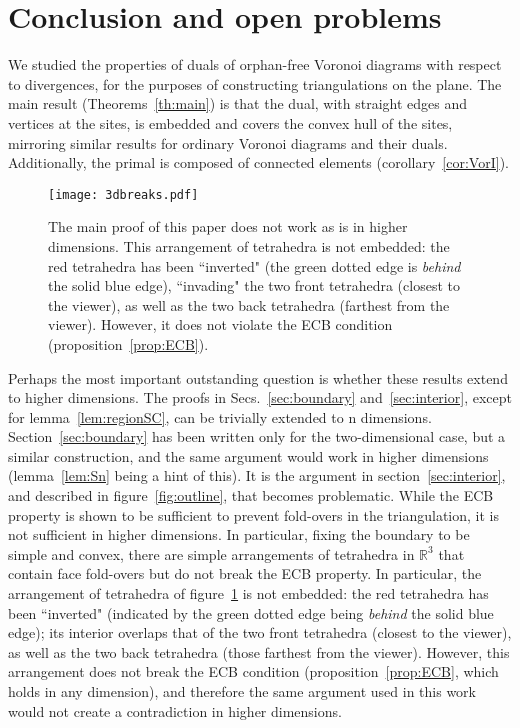 \documentclass[11pt]{article}
\begin{document}
\section{Conclusion and open problems}

We studied the properties of duals of orphan-free Voronoi diagrams with respect to divergences, for the
purposes of constructing triangulations on the plane. 
The main result (Theorems~\ref{th:main}) is that
the dual, with straight edges and vertices at the sites, is embedded
and covers the convex hull of the sites, mirroring similar results for
ordinary Voronoi diagrams and their duals.
Additionally, the primal is composed of connected elements (corollary~\ref{cor:VorI}). 




\begin{figure}[ht]
\centering
\texttt{[image: 3dbreaks.pdf]}
\caption{
	The main proof of this paper does not work as is in higher dimensions. 
This arrangement of tetrahedra is not embedded: 
	the red tetrahedra has been ``inverted" 
	(the green dotted edge is \emph{behind} the solid blue edge), 
	``invading" the two front tetrahedra (closest to the viewer), 
	as well as the two back tetrahedra (farthest from the viewer). 
However, it does not violate the ECB condition (proposition~\ref{prop:ECB}). 
}
\label{fig:3dbreaks}
\end{figure}
Perhaps the most important outstanding question is whether these results
extend to higher dimensions. The proofs in Secs.~\ref{sec:boundary} and~\ref{sec:interior},
except for lemma~\ref{lem:regionSC}, can be trivially extended to n dimensions. 
Section~\ref{sec:boundary} has been written only for the two-dimensional case,
but a similar construction, and the same argument would work in higher
dimensions (lemma~\ref{lem:Sn} being a hint of this). 
It is the argument in section~\ref{sec:interior}, and described in figure~\ref{fig:outline}, that becomes problematic. 
While the ECB property is shown to be sufficient to prevent fold-overs in the
triangulation, it is not sufficient in 
higher dimensions. In particular, fixing the boundary to be simple and convex, 
there are simple arrangements of tetrahedra in $\mathbb{R}^3$ that contain 
face fold-overs but do not break the ECB property. 
In particular, the arrangement of tetrahedra of figure~\ref{fig:3dbreaks} is not embedded: 
	the red tetrahedra has been ``inverted" 
	(indicated by the green dotted edge being \emph{behind} the solid blue edge); 
	its interior overlaps that of the two front tetrahedra (closest to the viewer), 
	as well as the two back tetrahedra (those farthest from the viewer). 
However, this arrangement does not break the ECB condition (proposition~\ref{prop:ECB}, which holds in any dimension), 
	and therefore the same argument used in this work would not create a 
	contradiction in higher dimensions. 
\end{document}
